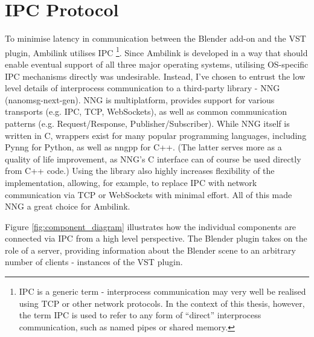 \section{IPC Protocol}
To minimise latency in communication between the Blender add-on and the VST plugin, Ambilink utilises IPC
\footnote{IPC is a generic term - interprocess communication may very well be realised using TCP or other network protocols.
In the context of this thesis, however, the term IPC is used to refer to any form of ``direct'' interprocess communication, such as named pipes or shared memory.}.
Since Ambilink is developed in a way that should enable eventual support of all three major operating systems,
utilising OS-specific IPC mechanisms directly was undesirable.
Instead, I've chosen to entrust the low level details of interprocess communication to a third-party library - NNG (nanomsg-next-gen).
NNG is multiplatform, provides support for various transports (e.g. IPC, TCP, WebSockets), as well as common communication patterns (e.g. Request/Response, Publisher/Subscriber).
While NNG itself is written in C, wrappers exist for many popular programming languages, including Pynng for Python, as well as nngpp for C++.
(The latter serves more as a quality of life improvement, as NNG's C interface can of course be used directly from C++ code.)
Using the library also highly increases flexibility of the implementation, allowing, for example, to replace IPC with network communication via TCP or WebSockets with minimal effort.
All of this made NNG a great choice for Ambilink.

Figure \ref{fig:component_diagram} illustrates how the individual components are connected via IPC from a high level perspective.
The Blender plugin takes on the role of a server, providing information about the Blender scene to
an arbitrary number of clients - instances of the VST plugin. 

